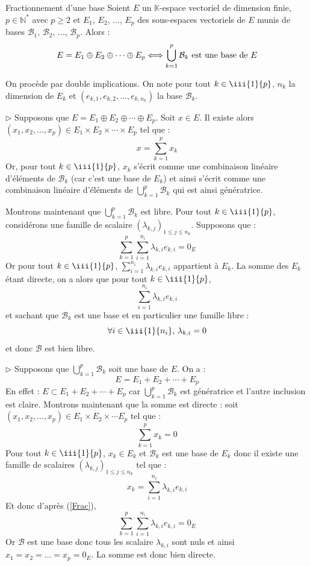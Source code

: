 \documentclass[french,11pt,twoside]{VcCours}
\newcommand{\Sum}[2]{\sum_{#1}^{#2}}
\begin{document}
\begin{Proposition}{Fractionnement d'une base}\label{UnionBase} Soient $E$ un $\mathbb{K}$-espace vectoriel de dimension finie, $p \in \mathbb{N}^*$ avec $p \geq 2$ et $E_1$, $E_2$, $\ldots$, $E_p$ des sous-espaces vectoriels de $E$ munis de bases $\mathcal{B}_1$, $\mathcal{B}_2$, $\ldots$, $\mathcal{B}_p$. Alors :
$$ E= E_1 \oplus E_2 \oplus \cdots \oplus E_p \Longleftrightarrow  \bigcup_{k=1}^p \mathcal{B}_k \hbox{ est une base de } E$$
\end{Proposition}

\begin{Demonstration}{} On procède par double implications. On note pour tout $k \in \iii{1}{p}$, $n_k$ la dimension de $E_k$ et $(e_{k,1}, e_{k,2}, \ldots, e_{k,n_k})$ la base $\mathcal{B}_k$.

\medskip

$\rhd$ Supposons que $E= E_1 \oplus E_2 \oplus \cdots \oplus E_p$. Soit $x \in E$. Il existe alors $(x_1, x_2, \ldots, x_p) \in E_1 \times E_2 \times \cdots \times E_p$ tel que :
$$ x = \sum_{k=1}^p x_k $$
Or, pour tout $k \in \iii{1}{p}$, $x_k$ s'écrit comme une combinaison linéaire d'éléments de $\mathcal{B}_k$ (car c'est une base de $E_k$) et ainsi s'écrit comme une combinaison linéaire d'éléments de $\bigcup_{k=1}^p \mathcal{B}_k$ qui est ainsi génératrice. 

\medskip 

Montrons maintenant que $\bigcup_{k=1}^p \mathcal{B}_k$ est libre. Pour tout $k \in \iii{1}{p}$, considérons une famille de scalaire $(\lambda_{k,j})_{1 \leq j \leq n_k}$. Supposons que :
$$ \sum_{k=1}^p \sum_{i=1}^{n_i} \lambda_{k,i} e_{k,i} = 0_E$$
Or pour tout $k \in \iii{1}{p}$, $\Sum{i=1}{n_i} \lambda_{k,i} e_{k,i}$ appartient à $E_k$. La somme des $E_k$ étant directe, on a alors que pour tout $k \in \iii{1}{p}$,
$$ \sum_{i=1}^{n_i} \lambda_{k,i} e_{k,i}$$
et sachant que $\mathcal{B}_k$ est une base et en particulier une famille libre :
$$ \forall i \in \iii{1}{n_i}, \, \lambda_{k,i} = 0$$
et donc $\mathcal{B}$ est bien libre.

\medskip

$\rhd$ Supposons que $\bigcup_{k=1}^p \mathcal{B}_k$ soit une base de $E$. On a :
$$ E= E_1 + E_2 + \cdots + E_p $$
En effet : $E \subset E_1 + E_2 + \cdots + E_p$ car $\bigcup_{k=1}^p \mathcal{B}_k$ est génératrice et l'autre inclusion est claire. Montrons maintenant que la somme est directe : soit $(x_1, x_2, \ldots, x_p) \in E_1 \times E_2 \times \cdots E_p$ tel que :
\begin{equation}\label{Frac} 
\sum_{k=1}^p x_k = 0
\end{equation}
Pour tout $k \in \iii{1}{p}$, $x_k \in E_k$ et $\mathcal{B}_k$ est une base de $E_k$ donc il existe une famille de scalaires $(\lambda_{k,j})_{1 \leq j \leq n_k}$ tel que :
$$ x_k = \sum_{i=1}^{n_i} \lambda_{k,i} e_{k,i}$$
Et donc d'après (\ref{Frac}), 
$$ \sum_{k=1}^p \sum_{i=1}^{n_i} \lambda_{k,i} e_{k,i} = 0_E$$
Or $\mathcal{B}$ est une base donc tous les scalaire $\lambda_{k,i}$ sont nuls et ainsi $x_1 = x_2 = \ldots = x_p = 0_E$. La somme est donc bien directe.

\end{Demonstration}
\end{document}
